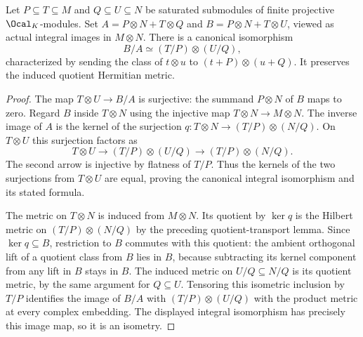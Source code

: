 \begin{lemma}
\label{lem:tensor-refinement-grades}
\leanok
Let $P\subseteq T\subseteq M$ and $Q\subseteq U\subseteq N$ be
saturated submodules of finite projective $\Ocal_K$-modules. Set
$A=P\otimes N+T\otimes Q$ and $B=P\otimes N+T\otimes U$, viewed
as actual integral images in $M\otimes N$. There is a canonical isomorphism
\[
 B/A\simeq (T/P)\otimes(U/Q),
\]
characterized by sending the class of $t\otimes u$ to
$(t+P)\otimes(u+Q)$. It preserves the induced quotient Hermitian metric.
\end{lemma}
\begin{proof}
The map $T\otimes U\to B/A$ is surjective: the summand $P\otimes N$
of $B$ maps to zero. Regard $B$ inside $T\otimes N$ using the injective
map $T\otimes N\to M\otimes N$. The inverse image of $A$ is the kernel
of the surjection $q:T\otimes N\to(T/P)\otimes(N/Q)$.
On $T\otimes U$ this surjection factors as
\[
 T\otimes U\longrightarrow (T/P)\otimes(U/Q)
 \longrightarrow (T/P)\otimes(N/Q).
\]
The second arrow is injective by flatness of $T/P$. Thus the kernels
of the two surjections from $T\otimes U$ are equal, proving the
canonical integral isomorphism and its stated formula.

The metric on $T\otimes N$ is induced from $M\otimes N$.
Its quotient by $\ker q$ is the Hilbert metric on
$(T/P)\otimes(N/Q)$ by the preceding quotient-transport lemma.
Since $\ker q\subseteq B$, restriction to $B$ commutes with this
quotient: the ambient orthogonal lift of a quotient class from $B$
lies in $B$, because subtracting its kernel component from any lift
in $B$ stays in $B$. The induced metric on $U/Q\subseteq N/Q$
is its quotient metric, by the same argument for $Q\subseteq U$.
Tensoring this isometric inclusion by $T/P$ identifies the image of
$B/A$ with $(T/P)\otimes(U/Q)$ with the product metric at every
complex embedding. The displayed integral isomorphism has precisely
this image map, so it is an isometry.
\end{proof}

